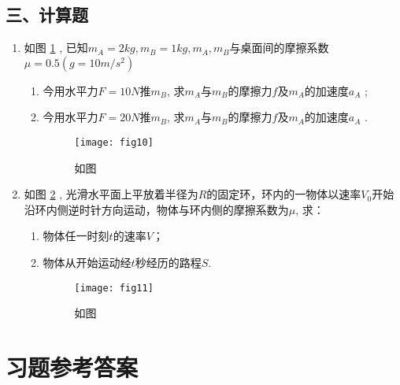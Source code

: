 \subsection*{三、计算题}
\begin{enumerate}
    \item 如图 \ref{fig:10} , 已知$m_A=2kg, m_B=1kg, m_A, m_B$与桌面间的摩擦系数$\mu=0.5(g=10m/s^2)$
    \begin{enumerate}
    \item[(1)] 今用水平力$F=10N$推$m_B$, 求$m_A$与$m_B$的摩擦力$f$及$m_A$的加速度$a_A$ ;
    \item[(2)] 今用水平力$F=20N$推$m_B$, 求$m_A$与$m_B$的摩擦力$f$及$m_A$的加速度$a_A$ .
        \begin{figure}[h]
            \centering
            \texttt{[image: fig10]}
            \caption{如图}\label{fig:10}
        \end{figure}
    \end{enumerate}
    \item 如图 \ref{fig:11} , 光滑水平面上平放着半径为$R$的固定环，环内的一物体以速率$V_0$开始沿环内侧逆时针方向运动，物体与环内侧的摩擦系数为$\mu$, 求：
    \begin{enumerate}
        \item[(1)] 物体任一时刻$t$的速率$V$；                                            
        \item[(2)] 物体从开始运动经$t$秒经历的路程$S$.
        \begin{figure}[h]
            \centering
            \texttt{[image: fig11]}
            \caption{如图}\label{fig:11}
        \end{figure} 
    \end{enumerate}
\end{enumerate}

\section{习题参考答案}
